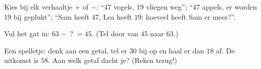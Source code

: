 \begin{exercise}[$\star$]\label{exo:g2:subtraction:8}
Kies bij elk verhaaltje $+$ of $-$: ``$47$ vogels, $19$ vliegen weg'';
``$47$ appels, er worden $19$ bij geplukt''; ``Sam heeft $47$, Lea heeft
$19$: hoeveel heeft Sam er meer?''.
\end{exercise}

\begin{exercise}[$\star$]\label{exo:g2:subtraction:9}
Vul het gat in: $63 - \;?\; = 45$. (Tel door van $45$ naar $63$.)
\end{exercise}

\begin{exercise}[$\star\star$]\label{exo:g2:subtraction:10}
Een spelletje: denk aan een getal, tel er $30$ bij op en haal er dan
$18$ af. De uitkomst is $58$. Aan welk getal dacht je? (Reken terug!)
\end{exercise}
